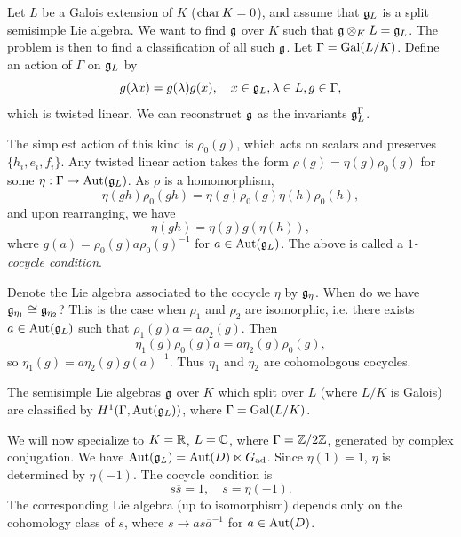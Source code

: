 \begin{remark}
  Let $L$ be a Galois extension of $K$ 
  ($\operatorname{char} K = 0$), and
  assume that $\mathfrak{g}_L$ is a split semisimple
  Lie algebra. We want to find
  $\mathfrak{g}$ over $K$
  such that $\mathfrak{g} \otimes_K L = \mathfrak{g}_L$.
  The problem is then to find a
  classification of all such $\mathfrak{g}$.
  Let
  $\Gamma = \operatorname{Gal}(L / K)$.
  Define an action of $\Gamma$ on $\mathfrak{g}_L$ by
  \[
    g(\lambda x) = g(\lambda) g(x),
    \quad x \in \mathfrak{g}_L, \lambda \in L,
    g \in \Gamma,
  \]
  which is twisted linear. We can
  reconstruct $\mathfrak{g}$ as the
  invariants $\mathfrak{g}_L^\Gamma$.

  The simplest action of this kind is
  $\rho_0(g)$, which acts on scalars
  and preserves $\{h_i, e_i, f_i\}$.
  Any twisted linear action
  takes the form $\rho(g) = \eta(g) \rho_0(g)$
  for some $\eta : \Gamma \to \operatorname{Aut}(\mathfrak{g}_L)$.
  As $\rho$ is a homomorphism,
  \[
    \eta(gh) \rho_0(gh)
    = \eta(g) \rho_0(g) \eta(h) \rho_0(h),
  \]
  and upon rearranging, we have
  \[
    \eta(gh)
    = \eta(g) g(\eta(h)),
  \]
  where $g(a) = \rho_0(g) a \rho_0(g)^{-1}$
  for $a \in \operatorname{Aut}(\mathfrak{g}_L)$.
  The above is called a
  \emph{$1$-cocycle condition}.

  Denote the Lie algebra associated
  to the cocycle $\eta$ by $\mathfrak{g}_\eta$.
  When do we have $\mathfrak{g}_{\eta_1} \cong \mathfrak{g}_{\eta_2}$?
  This is the case when $\rho_1$ and
  $\rho_2$ are isomorphic, i.e. there
  exists $a \in \operatorname{Aut}(\mathfrak{g}_L)$ such that
  $\rho_1(g) a = a \rho_2(g)$. Then
  \[
    \eta_1(g)
    \rho_0(g) a = a \eta_2(g) \rho_0(g),
  \]
  so $\eta_1(g) = a \eta_2(g) g(a)^{-1}$.
  Thus $\eta_1$ and $\eta_2$ are
  cohomologous cocycles.
\end{remark}

\begin{prop}
  The semisimple Lie algebras $\mathfrak{g}$
  over $K$ which split over $L$ (where
  $L / K$ is Galois) are classified by
  $H^1(\Gamma, \operatorname{Aut}(\mathfrak{g}_L))$, where
  $\Gamma = \operatorname{Gal}(L / K)$.
\end{prop}

\begin{remark}
  We will now specialize to
  $K = \mathbb{R}$, $L = \mathbb{C}$, where
  $\Gamma = \mathbb{Z} / 2\mathbb{Z}$, generated by
  complex conjugation.
  We have $\operatorname{Aut}(\mathfrak{g}_L) = \operatorname{Aut}(D) \ltimes G_{\mathrm{ad}}$.
  Since $\eta(1) = 1$, $\eta$ is determined
  by $\eta(-1)$.
  The cocycle condition is
  \[
    s \overline{s} = 1, \quad s = \eta(-1).
  \]
  The corresponding Lie algebra (up to
  isomorphism) depends only on the
  cohomology class of $s$, where
  $s \to a s \overline{a}^{-1}$ for $a \in \operatorname{Aut}(D)$.
\end{remark}

